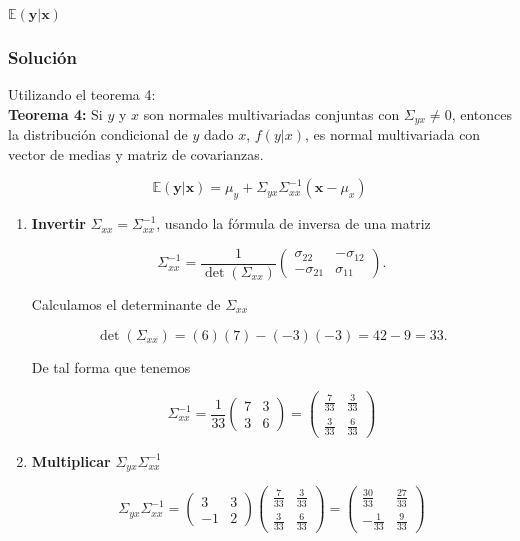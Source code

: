$\mathbb{E}(\mathbf{y}|\mathbf{x})$

\subsubsection{Solución}

Utilizando el teorema 4:\\
\textbf{Teorema 4:} Si $y$ y $x$ son normales multivariadas conjuntas con $\Sigma_{yx} \neq 0$, entonces la distribución condicional de $y$ dado $x$, $f(y | x)$, es normal multivariada con vector de medias y matriz de covarianzas.

$$\mathbb{E}(\mathbf{y}|\mathbf{x}) = \mu_y + \Sigma_{yx} \Sigma_{xx}^{-1} (\mathbf{x} - \mu_x)$$

\begin{enumerate}
    \item \textbf{Invertir }$\Sigma_{xx} = \Sigma_{xx}^{-1}$, usando la fórmula de inversa de una matriz

    $$
    \Sigma_{xx}^{-1} = \frac{1}{\det(\Sigma_{xx})} 
    \begin{pmatrix} 
    \sigma_{22} & -\sigma_{12} \\ 
    -\sigma_{21} & \sigma_{11} 
    \end{pmatrix}.
    $$

    Calculamos el determinante de $\Sigma_{xx}$

    $$
    \det(\Sigma_{xx}) = (6)(7) - (-3)(-3) = 42 - 9 = 33.
    $$

    De tal forma que tenemos

    $$
    \Sigma_{xx}^{-1} = \frac{1}{33} 
    \begin{pmatrix} 
    7 & 3 \\ 
    3 & 6 
    \end{pmatrix} =
    \begin{pmatrix} 
    \frac{7}{33} & \frac{3}{33} \\ 
    \frac{3}{33} & \frac{6}{33} 
    \end{pmatrix}
    $$

    \item \textbf{Multiplicar }$\Sigma_{yx} \Sigma_{xx}^{-1}$

    $$
    \Sigma_{yx} \Sigma_{xx}^{-1} = 
    \begin{pmatrix} 
    3 & 3 \\ 
    -1 & 2 
    \end{pmatrix}
    \begin{pmatrix} 
    \frac{7}{33} & \frac{3}{33} \\ 
    \frac{3}{33} & \frac{6}{33} 
    \end{pmatrix} =
    \begin{pmatrix} 
    \frac{30}{33} & \frac{27}{33} \\ 
    -\frac{1}{33} & \frac{9}{33} 
    \end{pmatrix}
    $$


\end{enumerate}
